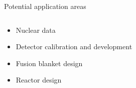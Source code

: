 \documentclass[xcolor=x11names,compress,handout]{beamer}
\renewcommand{\(}{\begin{columns}}
\renewcommand{\)}{\end{columns}}
\newcommand{\<}[1]{\begin{column}{#1}}
\renewcommand{\>}{\end{column}}
\begin{document}
\begin{frame}{Potential application areas}
\begin{columns}
    \begin{column}{0.5\linewidth}
      \begin{itemize}
        \item Nuclear data
        \item Detector calibration and development
        \item Fusion blanket design
        \item Reactor design
      \end{itemize}
      \renewcommand*{\thesubfigure}{}
      \vspace{-0.5cm}
      \begin{figure}[htp]
        \centering
        \subcapcentertrue
      \end{figure}
    \end{column}
    
  \end{columns}
\end{frame}
\end{document}
